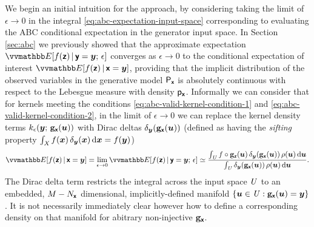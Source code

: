We begin an initial intuition for the approach, by considering taking the limit of $\epsilon \to 0$ in the integral \eqref{eq:abc-expectation-input-space} corresponding to evaluating the \ac{ABC} conditional expectation in the generator input space. In Section \ref{sec:abc} we previously showed that the approximate expectation $\expc{f(\rvct{z}) \gvn \rvct{y}= \vct{y};\,\epsilon}$ converges as $\epsilon \to 0$ to the conditional expectation of interest $\expc{f(\rvct{z}) \gvn \rvct{x} = \vct{y}}$, providing that the implicit distribution of the observed variables in the generative model $\mathsf{P}_{\boldsymbol{\mathsf{x}}}$ is absolutely continuous with respect to the Lebesgue measure with density $\mathsf{p}_{\boldsymbol{\mathsf{x}}}$. Informally we can consider that for kernels meeting the conditions \eqref{eq:abc-valid-kernel-condition-1} and \eqref{eq:abc-valid-kernel-condition-2}, in the limit of $\epsilon \to 0$ we can replace the kernel density terms $k_\epsilon\lpa{\vct{y}};\,\genfunc_{\rvct{x}}(\vct{u})\rpa$ with Dirac deltas ${\delta}_{\vct{y}}\lpa\genfunc_{\rvct{x}}(\vct{u})\rpa$ (defined as having the \emph{sifting} property $\int_{\mathit{X}} f(\boldsymbol{x}) \, \delta_{\boldsymbol{y}}(\boldsymbol{x})\,\mathrm{d}\boldsymbol{x} = f(\boldsymbol{y})$)
\begin{align}\label{eq:expectation-input-space-limit}
  \expc{f(\rvct{z}) \gvn \rvct{x}=\vct{y}} =
  \lim_{\epsilon\to 0}  \expc{f(\rvct{z}) \gvn \rvct{y}=\vct{y};\,\epsilon} 
  \simeq
  \frac{
  \int_{\set{U}} 
    f\circ\genfunc_{\rvct{z}}(\vct{u}) \,
    \delta_{\vct{y}}\lpa\genfunc_{\rvct{x}}(\vct{u})\rpa\,
    \rho(\vct{u})
  \,\dr\vct{u}
  }
  {
    \int_{\set{U}} 
    \delta_{\vct{y}}\lpa\genfunc_{\rvct{x}}(\vct{u})\rpa\,
    \rho(\vct{u})
  \,\dr\vct{u}
  }.
\end{align}
The Dirac delta term restricts the integral across the input space $\mathit{U}$ to an embedded, $M - N_{\boldsymbol{\mathsf{x}}}$ dimensional, implicitly-defined manifold $\fset{\vct{u} \in \set{U} :  \genfunc_{\rvct{x}}(\vct{u}) = \vct{y}}$. It is not necessarily immediately clear however how to define a corresponding density on that manifold for abitrary non-injective ${\mathbf{g}}_{\boldsymbol{\mathsf{x}}}$.

